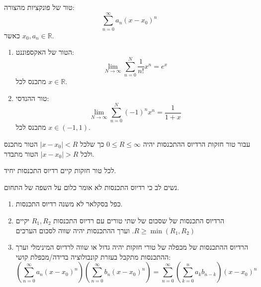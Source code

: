 \documentclass{tstextbook}
\begin{document}
\begin{definition}
טור של פונקציות מהצורה:
$$\sum_{n=0}^{\infty} a_{n}(x-x_{0})^{n}$$
כאשר \(x_{0},a_{n}\in \mathbb{R}\).

\end{definition}
\begin{example}
  \begin{enumerate}
    \item הטור של האקספוננט: 
$$\lim_{ N \to \infty } \sum_{n=0}^{N} \frac{1}{n!}x^{n}=e^{ x }$$
מתכנס לכל \(x \in \mathbb{R}\).


    \item טור ההנדסי: 
$$\lim_{ N \to \infty } \sum_{n=0}^{N} (-1)^{n}x^{n}=\frac{1}{1+x}$$
מתכנס לכל \(x \in (-1,1)\).


  \end{enumerate}
\end{example}
\begin{definition}
עבור טור חזקות הרדיוס ההתכנסות יהיה \(0\leq R\leq \infty\) כך שלכל \(\lvert x-x_{0} \rvert< R\) הטור מתכנס ולכל \(|x-x_{0}|> R\) הטור מתבדר.

\end{definition}
\begin{proposition}
לכל טור חזקות קיים רדיוס התכנסות יחיד. 

\end{proposition}
\begin{remark}
נשים לב כי רדיוס התכנסות לא אומר כלום על השפה של התחום.

\end{remark}
\begin{proposition}
  \begin{enumerate}
    \item כפל בסקלאר לא משנה רדיוס התכנסות. 


    \item הרדיוס התכנסות של שסכום של שתי טורים עם רדיוס התכנסות \(R_{1},R_{2}\) יקיים \(R\geq \min(R_{1},R_{2})\). וערך ההתכנסות יהיה שווה לסכום הערכים 


    \item הרדיוס ההתכנסות של מכפלה של טורי חזקות יהיה גדול או שווה לרדיוס המינימלי וערך ההתכנסות מתקבל בעזרת קונבולוציה בדידה/מכפלת קושי: 
$$\left(\sum_{n=0}^{\infty}a_{n}\left(x-x_{0}\right)^{n}\right)\left(\sum_{n=0}^{\infty}b_{n}\left(x-x_{0}\right)^{n}\right)=\sum_{n=0}^{\infty}\left(\sum_{k=0}^{n}a_{k}b_{n-k}\right)(x-x_{0})^{n}$$


  \end{enumerate}
\end{proposition}
\end{document}
